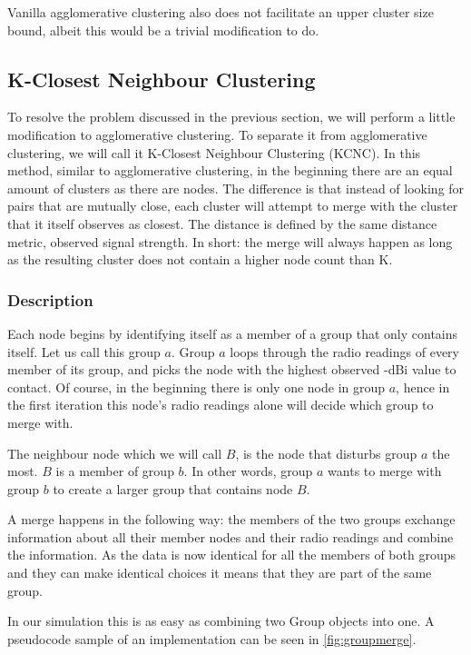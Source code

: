 Vanilla agglomerative clustering also does not facilitate an upper cluster size bound, albeit this would be a trivial modification to do. 
\subsection{K-Closest Neighbour Clustering}
\label{chap:kcn}
To resolve the problem discussed in the previous section, we will perform a little modification to agglomerative clustering. 
To separate it from agglomerative clustering, we will call it K-Closest Neighbour Clustering (KCNC). In this method, similar to agglomerative clustering, in the beginning there are an equal amount of  clusters as there are nodes. 
The difference is that instead of looking for pairs that are mutually close, each cluster will attempt to merge with the cluster that it itself observes as closest. The distance is defined by the same distance metric, observed signal strength. In short: the merge will always happen as long as the resulting cluster does not contain a higher node count than K.

\subsubsection{Description}
Each node begins by identifying itself as a member of a group that only contains itself. Let us call this group $a$.
Group $a$ loops through the radio readings of every member of its group, and picks the node with the highest observed -dBi value
to contact. Of course, in the beginning there is only one node in group $a$, hence in the first iteration this node's radio readings alone will decide which group to merge with. 

The neighbour node which we will call $B$, is the node that disturbs group $a$ the most. $B$ is a member of group $b$.
In other words, group $a$ wants to merge with group $b$ to create a larger group that contains node $B$.

A merge happens in the following way: the members of the two groups exchange information about all their member nodes and their radio readings and combine the information.
As the data is now identical for all the members of both groups and they can make identical choices it means that they are part of the same group. 

In our simulation this is as easy as combining two Group objects into one. A pseudocode sample of an implementation can be seen in \ref{fig:groupmerge}.

